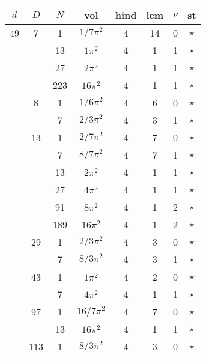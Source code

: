 \documentclass[12pt]{amsart}
\providecommand{\DIFadd}[1]{{\protect\color{blue}\uwave{#1}}} %
\providecommand{\DIFdel}[1]{{\protect\color{red}\sout{#1}}}                      %
\providecommand{\DIFaddbegin}{} %
\providecommand{\DIFaddend}{} %
\providecommand{\DIFdelbegin}{} %
\providecommand{\DIFdelend}{} %
\begin{document}
\begin{tabular}{ccc|ccccc}
$d$ & $D$ & $N$ & vol & hind & lcm & $\nu$ & st\\
\hline
49 & 7 & 1 & \DIFdelbegin \DIFdel{$1/7\pi^2$ }\DIFdelend \DIFaddbegin \DIFadd{$(1/7)\pi^2$ }\DIFaddend & 4 & 14 & 0 & $\star$ \\
 &  & 13 & \DIFdelbegin \DIFdel{$1\pi^2$ }\DIFdelend \DIFaddbegin \DIFadd{$\pi^2$ }\DIFaddend & 4 & 1 & 1 & $\star$ \\
 &  & 27 & $2\pi^2$ & 4 & 1 & 1 & $\star$ \\
 &  & 223 & $16\pi^2$ & 4 & 1 & 1 & $\star$ \\
 & 8 & 1 & \DIFdelbegin \DIFdel{$1/6\pi^2$ }\DIFdelend \DIFaddbegin \DIFadd{$(1/6)\pi^2$ }\DIFaddend & 4 & 6 & 0 & $\star$ \\
 &  & 7 & \DIFdelbegin \DIFdel{$2/3\pi^2$ }\DIFdelend \DIFaddbegin \DIFadd{$(2/3)\pi^2$ }\DIFaddend & 4 & 3 & 1 & $\star$ \\
 & 13 & 1 & \DIFdelbegin \DIFdel{$2/7\pi^2$ }\DIFdelend \DIFaddbegin \DIFadd{$(2/7)\pi^2$ }\DIFaddend & 4 & 7 & 0 & $\star$ \\
 &  & 7 & \DIFdelbegin \DIFdel{$8/7\pi^2$ }\DIFdelend \DIFaddbegin \DIFadd{$(8/7)\pi^2$ }\DIFaddend & 4 & 7 & 1 & $\star$ \\
 &  & 13 & $2\pi^2$ & 4 & 1 & 1 & $\star$ \\
 &  & 27 & $4\pi^2$ & 4 & 1 & 1 & $\star$ \\
 &  & 91 & $8\pi^2$ & 4 & 1 & 2 & $\star$ \\
 &  & 189 & $16\pi^2$ & 4 & 1 & 2 & $\star$ \\
 & 29 & 1 & \DIFdelbegin \DIFdel{$2/3\pi^2$ }\DIFdelend \DIFaddbegin \DIFadd{$(2/3)\pi^2$ }\DIFaddend & 4 & 3 & 0 & $\star$ \\
 &  & 7 & \DIFdelbegin \DIFdel{$8/3\pi^2$ }\DIFdelend \DIFaddbegin \DIFadd{$(8/3)\pi^2$ }\DIFaddend & 4 & 3 & 1 & $\star$ \\
 & 43 & 1 & \DIFdelbegin \DIFdel{$1\pi^2$ }\DIFdelend \DIFaddbegin \DIFadd{$\pi^2$ }\DIFaddend & 4 & 2 & 0 & $\star$ \\
 &  & 7 & $4\pi^2$ & 4 & 1 & 1 & $\star$ \\
 & 97 & 1 & \DIFdelbegin \DIFdel{$16/7\pi^2$ }\DIFdelend \DIFaddbegin \DIFadd{$(16/7)\pi^2$ }\DIFaddend & 4 & 7 & 0 & $\star$ \\
 &  & 13 & $16\pi^2$ & 4 & 1 & 1 & $\star$ \\
 & 113 & 1 & \DIFdelbegin \DIFdel{$8/3\pi^2$ }\DIFdelend \DIFaddbegin \DIFadd{$(8/3)\pi^2$ }\DIFaddend & 4 & 3 & 0 & $\star$ \\

\end{tabular}
\end{document}
